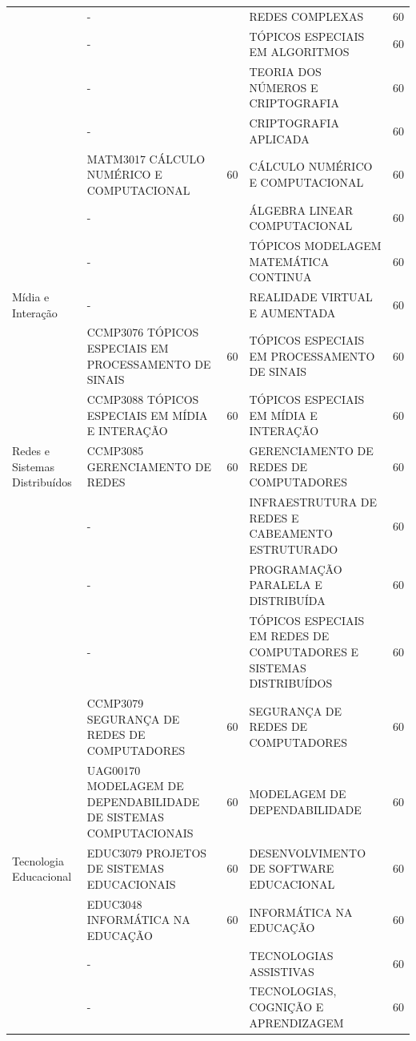 \documentclass[
	12pt,				%
	openright,			%
  oneside,     %
	a4paper,			%
	chapter=TITLE,		%
	english,			%
	french,				%
	spanish,			%
	brazil				%
	]{abntex2}
\begin{document}
\begin{center}
\begin{tiny}
\begin{longtable}{p{2cm}p{5.4cm}cp{5.4cm}c}
      & - & & REDES COMPLEXAS & 60 \\ \cline{2-5}
      & - & & TÓPICOS ESPECIAIS EM ALGORITMOS & 60 \\ \cline{2-5}
      & - & & TEORIA DOS NÚMEROS E CRIPTOGRAFIA & 60 \\ \cline{2-5}
      & - & & CRIPTOGRAFIA APLICADA & 60 \\ \cline{2-5}
      & MATM3017 CÁLCULO NUMÉRICO E COMPUTACIONAL & 60 & CÁLCULO NUMÉRICO E COMPUTACIONAL & 60 \\ \cline{2-5}
      & - & & ÁLGEBRA LINEAR COMPUTACIONAL & 60 \\ \cline{2-5}
      & - & & TÓPICOS MODELAGEM MATEMÁTICA CONTINUA & 60 \\ \midrule
    Mídia e Interação & - & & REALIDADE VIRTUAL E AUMENTADA & 60 \\ \cline{2-5}
      & CCMP3076 TÓPICOS ESPECIAIS EM PROCESSAMENTO DE SINAIS & 60 & TÓPICOS ESPECIAIS EM PROCESSAMENTO DE SINAIS & 60 \\ \cline{2-5}
      & CCMP3088 TÓPICOS ESPECIAIS EM MÍDIA E INTERAÇÃO & 60 & TÓPICOS ESPECIAIS EM MÍDIA E INTERAÇÃO & 60 \\ \midrule
    Redes e Sistemas Distribuídos & CCMP3085 GERENCIAMENTO DE REDES & 60 & GERENCIAMENTO DE REDES DE COMPUTADORES & 60 \\ \cline{2-5}
      & - & & INFRAESTRUTURA DE REDES E CABEAMENTO ESTRUTURADO & 60  \\ \cline{2-5}
      & - & & PROGRAMAÇÃO PARALELA E DISTRIBUÍDA & 60 \\ \cline{2-5}
      & - & & TÓPICOS ESPECIAIS EM REDES DE COMPUTADORES E SISTEMAS DISTRIBUÍDOS & 60 \\ \cline{2-5}
      & CCMP3079 SEGURANÇA DE REDES DE COMPUTADORES & 60 & SEGURANÇA DE REDES DE COMPUTADORES & 60 \\ \cline{2-5}
      & UAG00170 MODELAGEM DE DEPENDABILIDADE DE SISTEMAS COMPUTACIONAIS & 60 & MODELAGEM DE DEPENDABILIDADE & 60  \\ \midrule
    Tecnologia Educacional & EDUC3079 PROJETOS DE SISTEMAS EDUCACIONAIS & 60 & DESENVOLVIMENTO DE SOFTWARE EDUCACIONAL & 60 \\ \cline{2-5}
      & EDUC3048 INFORMÁTICA NA EDUCAÇÃO & 60 & INFORMÁTICA NA EDUCAÇÃO & 60 \\ \cline{2-5}
      & - & & TECNOLOGIAS ASSISTIVAS & 60 \\ \cline{2-5}
      & - & & TECNOLOGIAS, COGNIÇÃO E APRENDIZAGEM & 60 \\ \midrule

\end{longtable}
\end{tiny}
\end{center}
\end{document}
